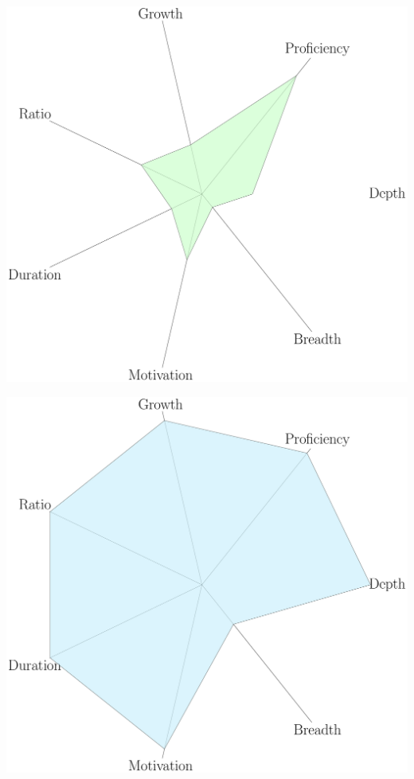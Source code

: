 \documentclass{beamer}
\begin{document}
\begin{frame}
\begin{columns}
            \begin{column}{.5\textwidth}
                \centering
                \includegraphics[height=.45\textheight]{static/hackathon/main.pdf}

                \includegraphics[height=.45\textheight]{static/phd/main.pdf}
            \end{column}
        \end{columns}
    \end{frame}
\end{document}
